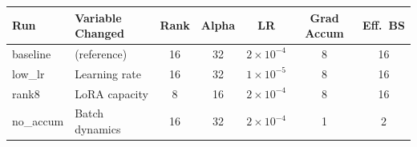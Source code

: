 \begin{tabular}{@{}llccccc@{}}
\toprule
\textbf{Run} & \textbf{Variable Changed} & \textbf{Rank} & \textbf{Alpha} & \textbf{LR} & \textbf{Grad Accum} & \textbf{Eff.\ BS} \\
\midrule
baseline & (reference)       & 16 & 32 & $2 \times 10^{-4}$ & 8 & 16 \\
low\_lr  & Learning rate     & 16 & 32 & $1 \times 10^{-5}$ & 8 & 16 \\
rank8    & LoRA capacity     &  8 & 16 & $2 \times 10^{-4}$ & 8 & 16 \\
no\_accum & Batch dynamics   & 16 & 32 & $2 \times 10^{-4}$ & 1 &  2 \\
\bottomrule
\end{tabular}
